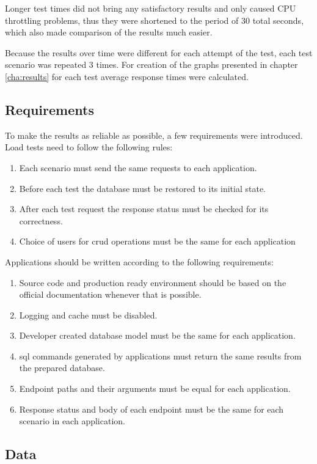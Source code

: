 Longer test times did not bring any satisfactory results and only caused CPU throttling problems, thus they were shortened to the period of 30 total seconds, which also made comparison of the results much easier.

Because the results over time were different for each attempt of the test, each test scenario was repeated 3 times. For creation of the graphs presented in chapter \ref{cha:results} for each test average response times were calculated.


\subsection{Requirements}

To make the results as reliable as possible, a few requirements were introduced. Load tests need to follow the following rules:
\begin{enumerate}
  \item Each scenario must send the same requests to each application.
  \item Before each test the database must be restored to its initial state.
  \item After each test request the response status must be checked for its correctness.
  \item Choice of users for \acrshort{crud} operations must be the same for each application
\end{enumerate}

Applications should be written according to the following requirements:
\begin{enumerate}
  \item Source code and production ready environment should be based on the official documentation whenever that is possible.
  \item Logging and cache must be disabled.
  \item Developer created database model must be the same for each application.
  \item \acrshort{sql} commands generated by applications must return the same results from the prepared database.
  \item Endpoint paths and their arguments must be equal for each application.
  \item Response status and body of each endpoint must be the same for each scenario in each application.
\end{enumerate}

\subsection{Data}\label{sub:population}

